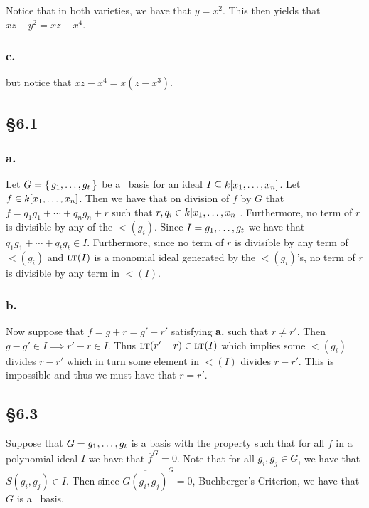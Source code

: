 \documentclass[letterpaper]{article}
\begin{document}
Notice that in both varieties, we have that $y = x^{2}$.
This then yields that $xz - y^{2} = xz - x^{4}$.

\subsubsection*{c.}

 but notice that $xz - x^{4} = x(z - x^{3})$.

\subsection*{\S 6.1}

\subsubsection*{a.}

Let $G = \set{g_{1}, \ldots, g_{t}}$ be a \Grobner\ basis for an ideal $I \subseteq k\bqty{x_{1}, \ldots, x_{n}}$.
Let $f \in k\bqty{x_{1}, \ldots, x_{n}}$.
Then we have that on division of $f$ by $G$ that $f = q_{1}g_{1} + \cdots + q_{n}g_{n} + r$ such that $r, q_{i} \in k\bqty{x_{1}, \ldots, x_{n}}$.
Furthermore, no term of $r$ is divisible by any of the $\lt(g_{i})$.
Since $I = \gen{g_{1}, \ldots, g_{t}}$ we have that $q_{1}g_{1} + \cdots + q_{t}g_{t} \in I$.
Furthermore, since no term of $r$ is divisible by any term of $\lt(g_{i})$ and $\gen{\lt(I)}$ is a monomial ideal generated by the $\lt(g_{i})$'s, no term of $r$ is divisible by any term in $\lt(I)$.

\subsubsection*{b.}

Now suppose that $f = g + r = g' + r'$ satisfying \textbf{a.} such that $r \neq r'$.
Then $g - g' \in I \implies r' - r \in I$.
Thus $\lt(r' - r) \in \gen{\lt(I)}$ which implies some $\lt(g_{i})$ divides $r - r'$ which in turn some element in $\lt(I)$ divides $r - r'$.
This is impossible and thus we must have that $r = r'$.

\subsection*{\S 6.3}

Suppose that $G = \gen{g_{1}, \ldots, g_{t}}$ is a basis with the property such that for all $f$ in a polynomial ideal $I$ we have that $\overline{f}^{G} = 0$.
Note that for all $g_{i}, g_{j} \in G$, we have that $S(g_{i}, g_{j}) \in I$.
Then since $\overline{G(g_{i}, g_{j})}^{G} = 0$, Buchberger's Criterion, we have that $G$ is a \Grobner\ basis.
\end{document}
